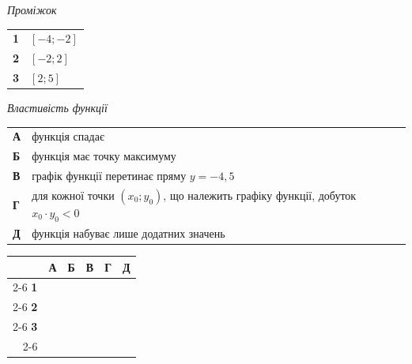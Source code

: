 \documentclass[14pt]{extarticle}
\begin{document}
\noindent
\begin{minipage}[t]{0.55\textwidth}
    \vspace{0pt}
    \textit{Проміжок} \par \vspace{0.2cm}
    \begin{tabular}{@{}p{0.5cm} p{3cm}@{}}
    \textbf{1} & $[-4; -2]$ \\[0.3cm]
    \textbf{2} & $[-2; 2]$ \\[0.3cm]
    \textbf{3} & $[2; 5]$ \\
    \end{tabular}
    
    \vspace{0.3cm}
    \textit{Властивість функції} \par \vspace{0.2cm}
    \begin{tabular}{@{}p{0.5cm} p{7cm}@{}}
    \textbf{А} & функція спадає \\[0.2cm]
    \textbf{Б} & функція має точку максимуму \\[0.2cm]
    \textbf{В} & графік функції перетинає пряму $y=-4{,}5$ \\[0.2cm]
    \textbf{Г} & для кожної точки $(x_0; y_0)$, що належить графіку функції, добуток $x_0 \cdot y_0 < 0$ \\[0.2cm]
    \textbf{Д} & функція набуває лише додатних значень \\
    \end{tabular}
    
    \vspace{0.3cm}
    
    \begingroup
    \setlength{\tabcolsep}{4pt}
    \renewcommand{\arraystretch}{1.2}
    \small
    \begin{tabular}{r|c|c|c|c|c|}
         \multicolumn{1}{c}{} & \multicolumn{1}{c}{\textbf{А}} & \multicolumn{1}{c}{\textbf{Б}} & \multicolumn{1}{c}{\textbf{В}} & \multicolumn{1}{c}{\textbf{Г}} & \multicolumn{1}{c}{\textbf{Д}} \\ \cline{2-6}
         \textbf{1} & & & & & \\ \cline{2-6}
         \textbf{2} & & & & & \\ \cline{2-6}
         \textbf{3} & & & & & \\ \cline{2-6}
    \end{tabular}
    \endgroup
\end{minipage}%
\hfill
\end{document}
